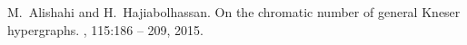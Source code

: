 M.~Alishahi and H.~Hajiabolhassan.
\newblock On the chromatic number of general {K}neser hypergraphs.
, 115:186 -- 209,
  2015.
